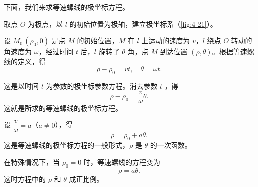 \medskip
下面，我们来求等速螺线的极坐标方程。

取点 $O$ 为极点，以 $l$ 的初始位置为极轴，建立极坐标系（\cref{fig:4-21}）。

设 $M_0\,(\rho_0,0)$ 是点 $M$ 的初始位置，$M$ 在 $l$ 上运动的速度为 $v$，$l$ 绕点 $O$ 转动的角速度为 $\omega$，经过时间 $t$ 后，$l$ 旋转了 $\theta$ 角，点 $M$ 到达位置 $(\rho,\theta)$。根据等速螺线的定义，得
\[ \rho-\rho_0=vt,\quad \theta=\omega t.\]

这是以时间 $t$ 为参数的极坐标参数方程。消去参数 $t$ ，得
\[ \rho-\rho_0=\frac{v}{\omega}\theta. \]
这就是所求的等速螺线的极坐标方程。

设 $\dfrac{v}{\omega}=a$（$a\neq 0$），得
\[\rho=\rho_0+a\theta.\]
这是等速螺线的极坐标方程的一般形式，$\rho$ 是 $\theta$ 的一次函数。

在特殊情况下，当 $\rho_0=0$ 时，等速螺线的方程变为
\[\rho=a\theta.\]
这时方程中的 $\rho$ 和 $\theta$ 成正比例。

